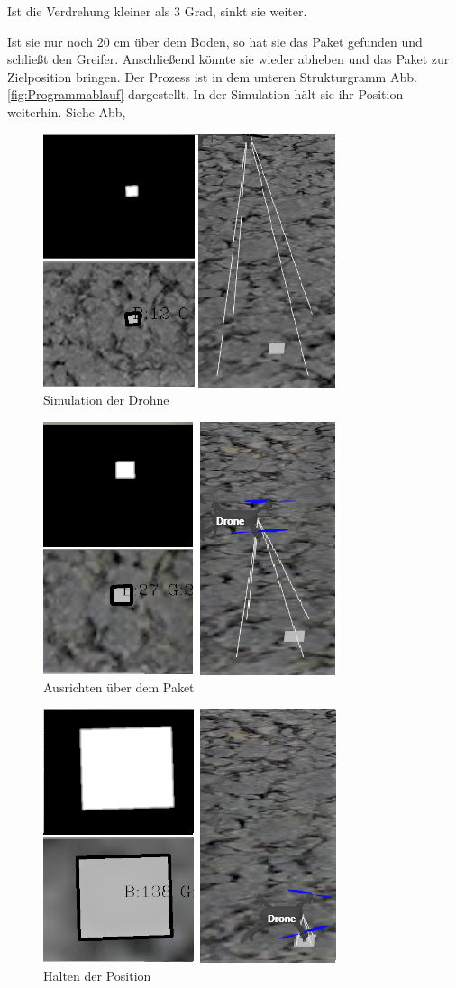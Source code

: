  Ist die Verdrehung kleiner als 3 Grad, sinkt sie weiter. 
 
   Ist sie nur noch 20 cm über dem Boden, so hat sie das Paket gefunden und schließt den Greifer. Anschließend könnte sie wieder abheben und das Paket zur Zielposition bringen. Der Prozess ist in dem unteren Strukturgramm Abb. \ref{fig:Programmablauf} dargestellt. In der Simulation hält sie ihr Position weiterhin. Siehe Abb, 
\begin{figure}[h]
	\centering
	\includegraphics[scale=1.3]{"Grafiken/Drone_Gazebossimulatiuon1.png"}
	\caption{Simulation der Drohne}
	\label{fig:Drone_Simulation1}
\end{figure}
\begin{figure}[h]
	\centering
	\includegraphics[scale=1.3]{"Grafiken/Drone_Gazebossimulatiuon2.png"}
	\caption{Ausrichten über dem Paket}
	\label{fig:Drone_Simulation2}
\end{figure}
\begin{figure}[h]
	\centering
	\includegraphics[scale=1.3]{"Grafiken/Drone_Gazebossimulatiuon3.png"}
	\caption{Halten der Position}
	\label{fig:Drone_Simulation3}
\end{figure}


